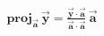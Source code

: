 \documentclass[preview]{standalone}
\begin{document}
\begin{align*}
\textbf{proj}_{\mathbf{\vec{a}}} \, \mathbf{\vec{y}} = \frac{\mathbf{\vec{y}} \cdot \mathbf{\vec{a}}}{\mathbf{\vec{a}} \cdot \mathbf{\vec{a}}} \, \mathbf{\vec{a}}
\end{align*}
\end{document}
